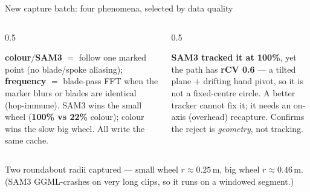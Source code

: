 \documentclass[aspectratio=169,10pt]{beamer}
\begin{document}
\begin{frame}{New capture batch: four phenomena, selected by data quality}
\begin{columns}[T]
\begin{column}{0.5\textwidth}
\begin{tcolorbox}[colback=cMeas!6,colframe=cMeas,title=\tiny Mode chosen from the scene,boxsep=1pt,left=3pt,right=3pt]
\tiny \textbf{colour}/\textbf{SAM3} $=$ follow one marked point (no blade/spoke aliasing);
\textbf{frequency} $=$ blade-pass FFT when the marker blurs or blades are identical (hop-immune).
SAM3 wins the small wheel (\textbf{100\% vs 22\%} colour); colour wins the slow big wheel. All write the same cache.
\end{tcolorbox}
\end{column}
\begin{column}{0.5\textwidth}
\begin{tcolorbox}[colback=cAccent!6,colframe=cAccent,title=\tiny Why the string clip was rejected,boxsep=1pt,left=3pt,right=3pt]
\tiny \textbf{SAM3 tracked it at 100\%}, yet the path has \textbf{rCV 0.6} --- a tilted plane $+$
drifting hand pivot, so it is not a fixed-centre circle. A better tracker cannot fix it; it needs
an on-axis (overhead) recapture. Confirms the reject is \emph{geometry}, not tracking.
\end{tcolorbox}
\end{column}
\end{columns}
\vspace{0.2em}
{\tiny Two roundabout radii captured --- small wheel $r{\approx}0.25$\,m, big wheel $r{\approx}0.46$\,m. (SAM3 GGML-crashes on very long clips, so it runs on a windowed segment.)}
\end{frame}
\end{document}
